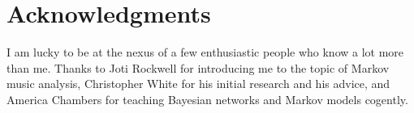\documentclass[letterpaper]{article}
\begin{document}
\section{ Acknowledgments}
I am lucky to be at the nexus of a few enthusiastic people who know a lot more than me. Thanks to Joti Rockwell for introducing me to the topic of Markov music analysis, Christopher White for his initial research and his advice, and America Chambers for teaching Bayesian networks and Markov models cogently.



\end{document}
